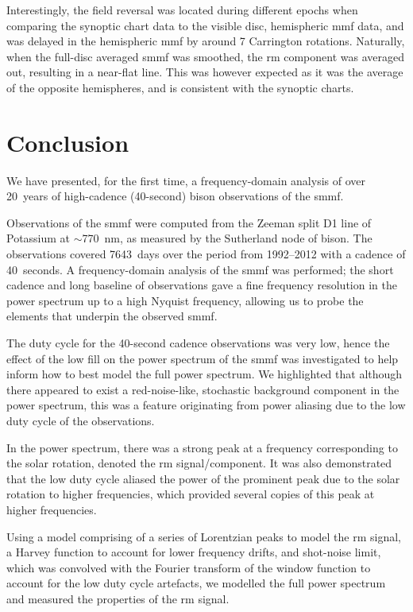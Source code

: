 Interestingly, the field reversal was located during different epochs when comparing the synoptic chart data to the visible disc, hemispheric \gls{mmf} data, and was delayed in the hemispheric \gls{mmf} by around 7 Carrington rotations. Naturally, when the full-disc averaged \gls{smmf} was smoothed, the \gls{rm} component was averaged out, resulting in a near-flat line. This was however expected as it was the average of the opposite hemispheres, and is consistent with the synoptic charts.


\section{Conclusion}\label{sec:SMMF_conclusion}

We have presented, for the first time, a frequency-domain analysis of over 20~years of high-cadence (40-second) \gls{bison} observations of the \gls{smmf}.

Observations of the \gls{smmf} were computed from the Zeeman split D1 line of Potassium at $\sim$770~nm, as measured by the Sutherland node of \gls{bison}. The observations covered 7643~days over the period from 1992--2012 with a cadence of 40~seconds. A frequency-domain analysis of the \gls{smmf} was performed; the short cadence and long baseline of observations gave a fine frequency resolution in the power spectrum up to a high Nyquist frequency, allowing us to probe the elements that underpin the observed \gls{smmf}.

The duty cycle for the 40-second cadence observations was very low, hence the effect of the low fill on the power spectrum of the \gls{smmf} was investigated to help inform how to best model the full power spectrum. We highlighted that although there appeared to exist a red-noise-like, stochastic background component in the power spectrum, this was a feature originating from power aliasing due to the low duty cycle of the observations.

In the power spectrum, there was a strong peak at a frequency corresponding to the solar rotation, denoted the \gls{rm} signal/component. It was also demonstrated that the low duty cycle aliased the power of the prominent peak due to the solar rotation to higher frequencies, which provided several copies of this peak at higher frequencies.

Using a model comprising of a series of Lorentzian peaks to model the \gls{rm} signal, a Harvey function to account for lower frequency drifts, and shot-noise limit, which was convolved with the Fourier transform of the window function to account for the low duty cycle artefacts, we modelled the full power spectrum and measured the properties of the \gls{rm} signal.

